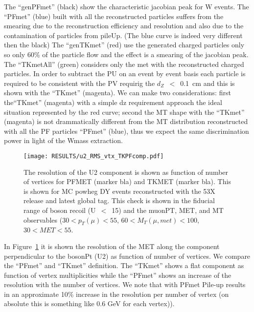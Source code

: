 The ``genPFmet'' (black) show the characteristic jacobian peak for W events.
The ``PFmet'' (blue) built with all the reconstructed particles suffers from the smearing due to the reconstruction efficiency and resolution and also due to the contamination of particles from pileUp. (The blue curve is indeed very different then the black)
The ``genTKmet'' (red) use the generated charged particles only so only 60\% of the particle flow and the effect is a smearing of the jacobian peak. 
The ``TKmetAll'' (green) considers only the met with the reconstructed charged particles. 
In order to subtract the PU on an event by event basis each particle is required to be consistent with the PV requirig the $d_{Z}$~$<$~0.1~cm and this is shown with the ``TKmet'' (magenta). 
We can make two considerations: first the``TKmet'' (magenta) with a simple dz requirement approach the ideal situation represented by the red curve; second the MT shape with the ``TKmet'' (magenta) is not drammatically different from the MT distribution reconstructed with all the PF particles ``PFmet'' (blue), thus we expect the same discrimination power in light of the Wmass extraction.

\begin{figure}[h!]
  \begin{center}
    \texttt{[image: RESULTS/u2\_RMS\_vtx\_TKPFcomp.pdf]}
    \caption{The resolution of the U2 component is shown as function of number of vertices for PFMET (marker bla) and TKMET (marker bla). This is shown for MC powheg DY events reconstructed with the 53X release and latest global tag. This check is shown in the fiducial range of boson recoil (U~$<$~15) and 
 the muonPT, MET, and MT observables ($30<p_{T}(\mu)<55$, $60<M_{T}(\mu,met)<100$, $30<MET<55$.
}
    \label{fig:PFMETvsTKMETresVTX}
  \end{center}
\end{figure}

In Figure~\ref{fig:PFMETvsTKMETresVTX} it is shown the resolution of the MET along the component perpendicular to the bosonPt (U2) as function of number of vertices. We compare the ``PFmet'' and ``TKmet'' definition. The ``TKmet'' shows a flat component as function of vertex multiplicities while the ``PFmet'' shows an increase of the resolution with the number of vertices. We note that with PFmet Pile-up results in an approximate 10\% increase in the resolution per number of vertex (on absolute this is something like 0.6 GeV for each vertex)).

